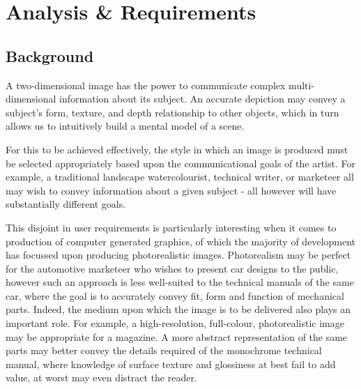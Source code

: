 



\chapter{Analysis \& Requirements}\label{analysis_requirements}

\section{Background}

A two-dimensional image has the power to communicate complex multi-dimensional information about its subject.
An accurate depiction may convey a subject's form, texture, and depth relationship to other objects, which in turn allows us to intuitively build a mental model of a scene.

For this to be achieved effectively, the style in which an image is produced must be selected appropriately based upon the communicational goals of the artist.
For example, a traditional landscape watercolourist, technical writer, or marketeer all may wish to convey information about a given subject - all however will have substantially different goals.

This disjoint in user requirements is particularly interesting when it comes to production of computer generated graphics, of which the majority of development has focussed upon producing photorealistic images.
Photorealism may be perfect for the automotive marketeer who wishes to present car designs to the public, however such an approach is less well-suited to the technical manuals of the same car, where the goal is to accurately convey fit, form and function of mechanical parts.
Indeed, the medium upon which the image is to be delivered also plays an important role.
For example, a high-resolution, full-colour, photorealistic image may be appropriate for a magazine. 
A more abstract representation of the same parts may better convey the details required of the monochrome technical manual, where knowledge of surface texture and glossiness at best fail to add value, at worst may even distract the reader.


